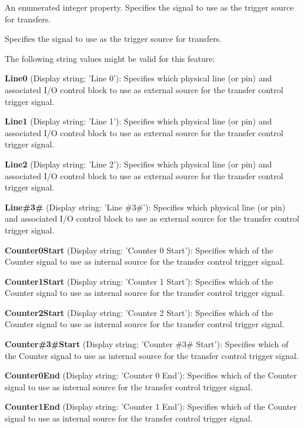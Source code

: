 An enumerated integer property. Specifies the signal to use as the trigger source for transfers. 

Specifies the signal to use as the trigger source for transfers.

The following string values might be valid for this feature\+:
\begin{DoxyItemize}
\item {\bfseries Line0} (Display string\+: 'Line 0')\+: Specifies which physical line (or pin) and associated I/\+O control block to use as external source for the transfer control trigger signal.
\item {\bfseries Line1} (Display string\+: 'Line 1')\+: Specifies which physical line (or pin) and associated I/\+O control block to use as external source for the transfer control trigger signal.
\item {\bfseries Line2} (Display string\+: 'Line 2')\+: Specifies which physical line (or pin) and associated I/\+O control block to use as external source for the transfer control trigger signal.
\item {\bfseries Line\#3\#} (Display string\+: 'Line \#3\#')\+: Specifies which physical line (or pin) and associated I/\+O control block to use as external source for the transfer control trigger signal.
\item {\bfseries Counter0\+Start} (Display string\+: 'Counter 0 Start')\+: Specifies which of the Counter signal to use as internal source for the transfer control trigger signal.
\item {\bfseries Counter1\+Start} (Display string\+: 'Counter 1 Start')\+: Specifies which of the Counter signal to use as internal source for the transfer control trigger signal.
\item {\bfseries Counter2\+Start} (Display string\+: 'Counter 2 Start')\+: Specifies which of the Counter signal to use as internal source for the transfer control trigger signal.
\item {\bfseries Counter\#3\#Start} (Display string\+: 'Counter \#3\# Start')\+: Specifies which of the Counter signal to use as internal source for the transfer control trigger signal.
\item {\bfseries Counter0\+End} (Display string\+: 'Counter 0 End')\+: Specifies which of the Counter signal to use as internal source for the transfer control trigger signal.
\item {\bfseries Counter1\+End} (Display string\+: 'Counter 1 End')\+: Specifies which of the Counter signal to use as internal source for the transfer control trigger signal.

\end{DoxyItemize}
